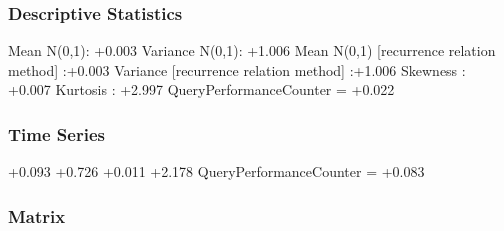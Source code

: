 \documentclass[9pt]{article}
\theoremstyle{plain}
\theoremstyle{definition}
\theoremstyle{remark}
\numberwithin{equation}{section}
\begin{document}
\subsubsection{Descriptive Statistics}
Mean N(0,1): +0.003
Variance N(0,1): +1.006
Mean N(0,1) [recurrence relation method] :+0.003
Variance [recurrence relation method] :+1.006
Skewness : +0.007
Kurtosis : +2.997
QueryPerformanceCounter  =  +0.022
\subsubsection{Time Series }
+0.093
+0.726
+0.011
+2.178
QueryPerformanceCounter  =  +0.083
\subsubsection{Matrix}
\end{document}
